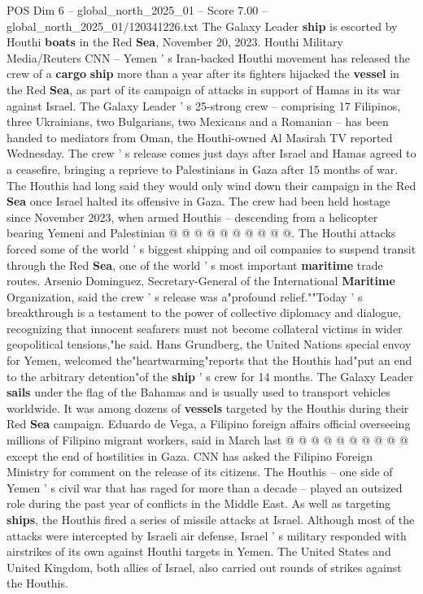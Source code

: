 \begin{textsample}{POS Dim 6 – global\_north\_2025\_01 – Score 7.00 – global\_north\_2025\_01/120341226.txt}  \label{ex:f6_pos_341}
The Galaxy Leader \textbf{ship} is escorted by Houthi \textbf{boats} in the Red \textbf{Sea}, November 20, 2023.
Houthi Military Media/Reuters CNN -- Yemen ' s Iran-backed Houthi movement has released the crew of a \textbf{cargo} \textbf{ship} more than a year after its fighters hijacked the \textbf{vessel} in the Red \textbf{Sea}, as part of its campaign of attacks in support of Hamas in its war against Israel.
The Galaxy Leader ' s 25-strong crew -- comprising 17 Filipinos, three Ukrainians, two Bulgarians, two Mexicans and a Romanian -- has been handed to mediators from Oman, the Houthi-owned Al Masirah TV reported Wednesday.
The crew ' s release comes just days after Israel and Hamas agreed to a ceasefire, bringing a reprieve to Palestinians in Gaza after 15 months of war.
The Houthis had long said they would only wind down their campaign in the Red \textbf{Sea} once Israel halted its offensive in Gaza.
The crew had been held hostage since November 2023, when armed Houthis -- descending from a helicopter bearing Yemeni and Palestinian @ @ @ @ @ @ @ @ @ @.
The Houthi attacks forced some of the world ' s biggest shipping and oil companies to suspend transit through the Red \textbf{Sea}, one of the world ' s most important \textbf{maritime} trade routes.
Arsenio Dominguez, Secretary-General of the International \textbf{Maritime} Organization, said the crew ' s release was a"profound relief.""Today ' s breakthrough is a testament to the power of collective diplomacy and dialogue, recognizing that innocent seafarers must not become collateral victims in wider geopolitical tensions,"he said.
Hans Grundberg, the United Nations special envoy for Yemen, welcomed the"heartwarming"reports that the Houthis had"put an end to the arbitrary detention"of the \textbf{ship} ' s crew for 14 months.
The Galaxy Leader \textbf{sails} under the flag of the Bahamas and is usually used to transport vehicles worldwide.
It was among dozens of \textbf{vessels} targeted by the Houthis during their Red \textbf{Sea} campaign.
Eduardo de Vega, a Filipino foreign affairs official overseeing millions of Filipino migrant workers, said in March last @ @ @ @ @ @ @ @ @ @ except the end of hostilities in Gaza.
CNN has asked the Filipino Foreign Ministry for comment on the release of its citizens.
The Houthis -- one side of Yemen ' s civil war that has raged for more than a decade -- played an outsized role during the past year of conflicts in the Middle East.
As well as targeting \textbf{ships}, the Houthis fired a series of missile attacks at Israel.
Although most of the attacks were intercepted by Israeli air defense, Israel ' s military responded with airstrikes of its own against Houthi targets in Yemen.
The United States and United Kingdom, both allies of Israel, also carried out rounds of strikes against the Houthis.

\end{textsample}
